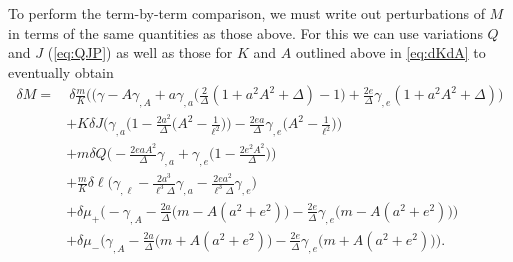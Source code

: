 \documentclass[
twoside,
openright,
frontopenright
]{dmathesis}
\newcommand{\nn}{\nonumber}
\begin{document}
To perform the term-by-term comparison, we must write out perturbations of $M$
in terms of the same quantities as those above. For this we can use variations
$Q$ and $J$ (\cref{eq:QJP}) as well as those for $K$ and $A$ outlined above in
\cref{eq:dKdA} to eventually obtain 
\begin{align}
\delta M = &~\delta\frac{m}{K}\bigg((\gamma-A\gamma_{,A}+a\gamma_{,a}\Big(\frac{2}{\Delta}(1+a^2A^2+\Delta)-1\Big)+\frac{2e}{\Delta}\gamma_{,e}(1+a^2A^2+\Delta)\bigg) \nn\\
&+K\delta J\bigg(\gamma_{,a}\Big(1-\frac{2a^2}{\Delta}\Big(A^2-\frac{1}{\ell^2}\Big)\Big)-\frac{2ea}{\Delta}\gamma_{,e}\Big(A^2-\frac{1}{\ell^2}\Big)\bigg) \nn\\
&+m\delta Q\bigg(-\frac{2eaA^2}{\Delta}\gamma_{,a}+\gamma_{,e}\Big(1-\frac{2e^2A^2}{\Delta}\Big)\bigg) \nn\\
&+\frac{m}{K}\delta\ell\Big(\gamma_{,\ell}-\frac{2a^3}{\ell^3\Delta}\gamma_{,a}-\frac{2ea^2}{\ell^3\Delta}\gamma_{,e}\Big) \nn\\
&+\delta \mu_+\Big( -\gamma_{,A}-\frac{2a}{\Delta}\big(m-A(a^2+e^2)\big)-\frac{2e}{\Delta}\gamma_{,e}\big(m-A(a^2+e^2)\big)\Big) \nn\\
&+\delta \mu_-\Big( \gamma_{,A}-\frac{2a}{\Delta}\big(m+A(a^2+e^2)\big)-\frac{2e}{\Delta}\gamma_{,e}\big(m+A(a^2+e^2)\big)\Big).
\label{eq:dM2}
\end{align}
\end{document}
